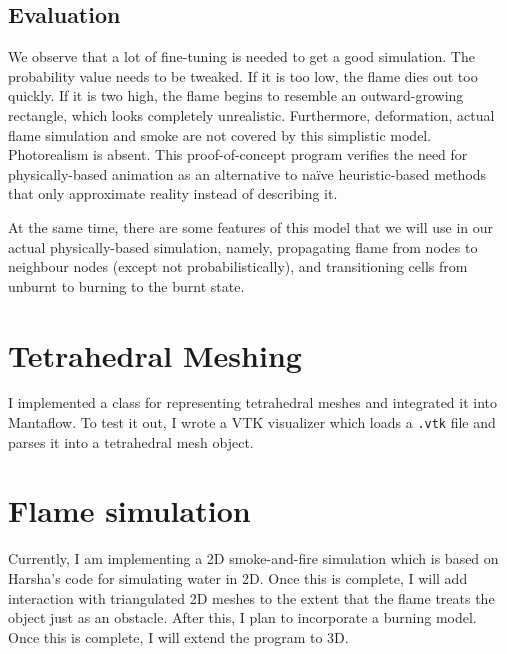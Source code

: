 \documentclass[a4paper]{report}
\begin{document}
\subsection{Evaluation}

We observe that a lot of fine-tuning is needed to get a good simulation. The probability value needs to be tweaked. If it is too low, the flame dies out too quickly. If it is two high, the flame begins to resemble an outward-growing rectangle, which looks completely unrealistic. Furthermore, deformation, actual flame simulation and smoke are not covered by this simplistic model. Photorealism is absent. This proof-of-concept program verifies the need for physically-based animation as an alternative to na\"ive heuristic-based methods that only approximate reality instead of describing it.

At the same time, there are some features of this model that we will use in our actual physically-based simulation, namely, propagating flame from nodes to neighbour nodes (except not probabilistically), and transitioning cells from unburnt to burning to the burnt state.

\section{Tetrahedral Meshing}

I implemented a class for representing tetrahedral meshes and integrated it into Mantaflow. To test it out, I wrote a VTK visualizer which loads a \texttt{.vtk} file and parses it into a tetrahedral mesh object.

\section{Flame simulation}

Currently, I am implementing a 2D smoke-and-fire simulation which is based on Harsha's code for simulating water in 2D. Once this is complete, I will add interaction with triangulated 2D meshes to the extent that the flame treats the object just as an obstacle. After this, I plan to incorporate a burning model. Once this is complete, I will extend the program to 3D.

{}
\end{document}
